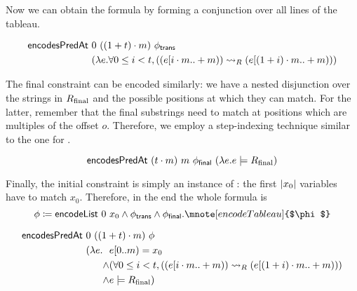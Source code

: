 Now we can obtain the formula  by forming a conjunction over all lines of the tableau.
\begin{lemma}
  \begin{align*}
    \textsf{encodesPredAt}~&0~((1 +{t}) \cdot m)~\phi_{\textsf{trans}} \\
                                                   &(\lambda e. \forall 0 \le i < t, ((e[i \cdot m..+m)) \rightsquigarrow_{R} (e[(1 +{i}) \cdot m ..+m)))
  \end{align*}
\end{lemma}


The final constraint can be encoded similarly: we have a nested disjunction over the strings in $R_{\text{final}}$ and the possible positions at which they can match. For the latter, remember that the final substrings need to match at positions which are multiples of the offset $o$. Therefore, we employ a step-indexing technique similar to the one for \encodeWindowsLine. 

\begin{lemma}
  \[\textsf{encodesPredAt}~(t \cdot m)~m~\phi_{\textsf{final}}~(\lambda e. e \models R_{\text{final}}) \]
\end{lemma}

Finally, the initial constraint is simply an instance of \encodeList: the first $|x_0|$ variables have to match $x_0$. 
Therefore, in the end the whole formula is
\[ \phi \defeq \encodeList~0~x_0 \land \phi_{\textsf{trans}} \land \phi_{\textsf{final}}.\mnote[encodeTableau]{$\phi$} \]

\begin{lemma}\label{lem:phi_correct}
  \begin{align*}
    \textsf{encodesPredAt}~&0~((1 +{t}) \cdot m)~\phi \\
                 &(\lambda e. \begin{aligned}[t]
                  &e[0..m) = x_0 \\
                   \land &  (\forall 0 \le i < t, ((e[i \cdot m..+m)) \rightsquigarrow_{R} (e[(1 +{i}) \cdot m..+m))) \\
                  \land & e \models R_{\text{final}})
                \end{aligned}
  \end{align*}
\end{lemma}

